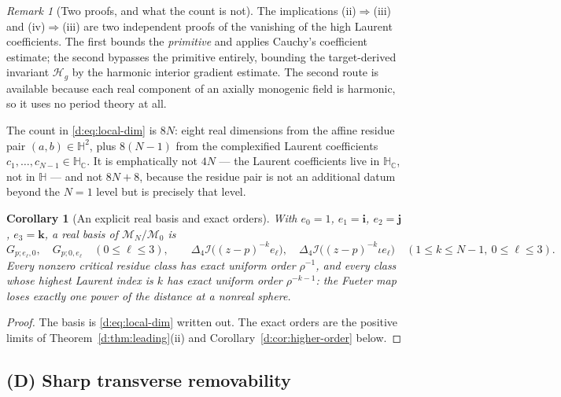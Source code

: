 \documentclass[11pt,a4paper]{article}
\numberwithin{equation}{section}
\newtheorem{corollary}[theorem]{Corollary}
\theoremstyle{definition}
\theoremstyle{remark}
\newtheorem{remark}[theorem]{Remark}
\theoremstyle{plain}
\newcommand{\HH}{\mathbb H}
\newcommand{\HC}{\mathbb H_{\mathbb C}}
\newcommand{\lap}{\Delta_4}
\newcommand{\I}{\mathcal I}
\newcommand{\Hg}{\mathcal H_{g}}      %
\begin{document}
\begin{remark}[Two proofs, and what the count is not]
\label{d:rem:two-proofs}
The implications (ii)$\Rightarrow$(iii) and (iv)$\Rightarrow$(iii) are two
independent proofs of the vanishing of the high Laurent coefficients.  The
first bounds the \emph{primitive} and applies Cauchy's coefficient
estimate; the second bypasses the primitive entirely, bounding the
target-derived invariant $\Hg$ by the harmonic interior gradient estimate.
The second route is available because each real component of an axially
monogenic field is harmonic, so it uses no period theory at all.

The count in \eqref{d:eq:local-dim} is $8N$: eight real dimensions from the
affine residue pair $(a,b)\in\HH^2$, plus $8(N-1)$ from the complexified
Laurent coefficients $c_1,\dots,c_{N-1}\in\HC$.  It is emphatically not
$4N$ --- the Laurent coefficients live in $\HC$, not in $\HH$ --- and not
$8N+8$, because the residue pair is not an additional datum beyond the
$N=1$ level but is precisely that level.
\end{remark}

\begin{corollary}[An explicit real basis and exact orders]
\label{d:cor:basis}
With $e_0=1$, $e_1=\mathbf i$, $e_2=\mathbf j$, $e_3=\mathbf k$, a real
basis of $\mathcal M_N/\mathcal M_0$ is
\[
 G_{p;e_\ell,0},\quad G_{p;0,e_\ell}\quad(0\le\ell\le3),
 \qquad
 \lap\I\bigl((z-p)^{-k}e_\ell\bigr),\quad
 \lap\I\bigl((z-p)^{-k}\iota e_\ell\bigr)
 \quad(1\le k\le N-1,\ 0\le\ell\le3).
\]
Every nonzero critical residue class has exact uniform order $\rho^{-1}$,
and every class whose highest Laurent index is $k$ has exact uniform order
$\rho^{-k-1}$: the Fueter map loses exactly one power of the distance at a
nonreal sphere.
\end{corollary}

\begin{proof}
The basis is \eqref{d:eq:local-dim} written out.  The exact orders are the
positive limits of Theorem~\ref{d:thm:leading}(ii) and
Corollary~\ref{d:cor:higher-order} below.
\end{proof}

\subsection{(D) Sharp transverse removability}
\end{document}
